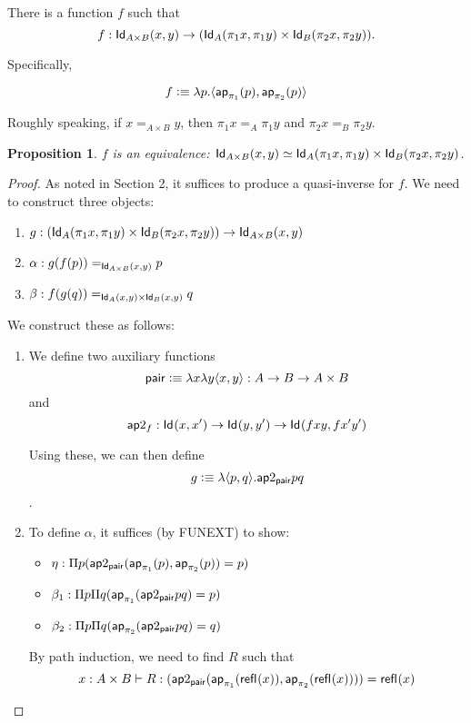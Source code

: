 \documentclass[12pt]{article}
\newcommand{\ap}{\mathsf{ap}}
\newtheorem*{proposition}{Proposition}
\begin{document}
There is a function $f$ such that
$$f: \mathsf{Id}_{A\times B}(x,y) \to (\mathsf{Id}_{A}(\pi_1 x, \pi_1 y) \times \mathsf{Id}_{B}(\pi_2 x,\pi_2 y)).$$

Specifically,

$$f\defeq \lambda p.\langle \ap_{\pi_1} (p) , \ap_{\pi_2} (p) \rangle$$

Roughly speaking, if $x =_{A\times B} y$, then $\pi_1 x =_A \pi_1 y$ and $\pi_2 x =_B \pi_2 y$.

\begin{proposition} $f$ is an equivalence:
 $\mathsf{Id}_{A\times B}(x,y) \simeq \mathsf{Id}_{A}(\pi_1 x, \pi_1 y) \times \mathsf{Id}_{B}(\pi_2 x, \pi_2 y)$.
\end{proposition}

\begin{proof}
 As noted in Section 2, it suffices to produce a quasi-inverse for $f$.
 We need to construct three objects:
 \begin{enumerate}
  \item $g: ( \mathsf{Id}_{A}(\pi_1 x, \pi_1 y) \times \mathsf{Id}_{B}(\pi_2 x, \pi_2 y) ) \to \mathsf{Id}_{A\times B} (x,y)$
  \item $\alpha: g(f(p)) =_{\mathsf{Id}_{A\times B} (x,y)} p$
  \item $\beta: f(g(q)) =_{\mathsf{Id}_{A}(x,y)\times \mathsf{Id}_{B}(x,y)} q$
 \end{enumerate}
 We construct these as follows:
 \begin{enumerate}
  \item We define two auxiliary functions
  $$\mathsf{pair} \vcentcolon\equiv \lambda x \lambda y \langle x, y \rangle : A\to B\to A\times B$$
  and
  $$\ap2_f: \Id{}(x,x') \to \Id{}(y,y') \to \Id{}(f x y, f x' y')$$ 
  
  Using these, we can then define
  $$g\defeq \lambda \langle p,q \rangle .\ap2_\pair p q$$.
  
  \item To define $\alpha$, it suffices (by FUNEXT) to show:
  \begin{itemize}
   \item $\eta: \Pi p(\ap2_\pair (\ap_{\pi_1}(p), \ap_{\pi_2}(p)) = p)$
   \item $\beta_1: \Pi p \Pi q (\ap_{\pi_1} (\ap2_\pair p q) = p)$
   \item $\beta_2: \Pi p \Pi q (\ap_{\pi_2} (\ap2_\pair p q) = q)$
  \end{itemize}

  By path induction, we need to find $R$ such that
  $$x:A\times B \entails R:(\ap2_\pair(\ap_{\pi_1}(\refl{}(x)),\ap_{\pi_2}(\refl{}(x))))=\refl{}(x)$$
  

\end{enumerate}
\end{proof}
\end{document}
